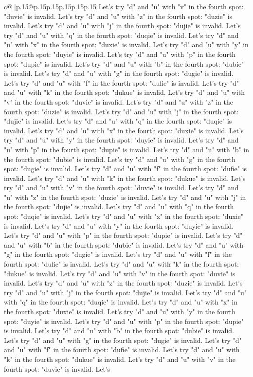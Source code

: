 \documentclass{article}
\begin{document}
{\begin{supertabular}{c@{$\;$}|p{.15\linewidth}@{}p{.15\linewidth}p{.15\linewidth}p{.15\linewidth}p{.15\linewidth}p{.15\linewidth}}
{{{Let's try "d" and "u" with "v" in the fourth spot: "duvie" is invalid. Let's try "d" and "u" with "z" in the fourth spot: "duzie" is invalid. Let's try "d" and "u" with "j" in the fourth spot: "dujie" is invalid. Let's try "d" and "u" with "q" in the fourth spot: "duqie" is invalid. Let's try "d" and "u" with "x" in the fourth spot: "duxie" is invalid. Let's try "d" and "u" with "y" in the fourth spot: "duyie" is invalid. Let's try "d" and "u" with "p" in the fourth spot: "dupie" is invalid. Let's try "d" and "u" with "b" in the fourth spot: "dubie" is invalid. Let's try "d" and "u" with "g" in the fourth spot: "dugie" is invalid. Let's try "d" and "u" with "f" in the fourth spot: "dufie" is invalid. Let's try "d" and "u" with "k" in the fourth spot: "dukue" is invalid. Let's try "d" and "u" with "v" in the fourth spot: "duvie" is invalid. Let's try "d" and "u" with "z" in the fourth spot: "duzie" is invalid. Let's try "d" and "u" with "j" in the fourth spot: "dujie" is invalid. Let's try "d" and "u" with "q" in the fourth spot: "duqie" is invalid. Let's try "d" and "u" with "x" in the fourth spot: "duxie" is invalid. Let's try "d" and "u" with "y" in the fourth spot: "duyie" is invalid. Let's try "d" and "u" with "p" in the fourth spot: "dupie" is invalid. Let's try "d" and "u" with "b" in the fourth spot: "dubie" is invalid. Let's try "d" and "u" with "g" in the fourth spot: "dugie" is invalid. Let's try "d" and "u" with "f" in the fourth spot: "dufie" is invalid. Let's try "d" and "u" with "k" in the fourth spot: "dukue" is invalid. Let's try "d" and "u" with "v" in the fourth spot: "duvie" is invalid. Let's try "d" and "u" with "z" in the fourth spot: "duzie" is invalid. Let's try "d" and "u" with "j" in the fourth spot: "dujie" is invalid. Let's try "d" and "u" with "q" in the fourth spot: "duqie" is invalid. Let's try "d" and "u" with "x" in the fourth spot: "duxie" is invalid. Let's try "d" and "u" with "y" in the fourth spot: "duyie" is invalid. Let's try "d" and "u" with "p" in the fourth spot: "dupie" is invalid. Let's try "d" and "u" with "b" in the fourth spot: "dubie" is invalid. Let's try "d" and "u" with "g" in the fourth spot: "dugie" is invalid. Let's try "d" and "u" with "f" in the fourth spot: "dufie" is invalid. Let's try "d" and "u" with "k" in the fourth spot: "dukue" is invalid. Let's try "d" and "u" with "v" in the fourth spot: "duvie" is invalid. Let's try "d" and "u" with "z" in the fourth spot: "duzie" is invalid. Let's try "d" and "u" with "j" in the fourth spot: "dujie" is invalid. Let's try "d" and "u" with "q" in the fourth spot: "duqie" is invalid. Let's try "d" and "u" with "x" in the fourth spot: "duxie" is invalid. Let's try "d" and "u" with "y" in the fourth spot: "duyie" is invalid. Let's try "d" and "u" with "p" in the fourth spot: "dupie" is invalid. Let's try "d" and "u" with "b" in the fourth spot: "dubie" is invalid. Let's try "d" and "u" with "g" in the fourth spot: "dugie" is invalid. Let's try "d" and "u" with "f" in the fourth spot: "dufie" is invalid. Let's try "d" and "u" with "k" in the fourth spot: "dukue" is invalid. Let's try "d" and "u" with "v" in the fourth spot: "duvie" is invalid. Let's }}}
\end{supertabular}}
\end{document}
